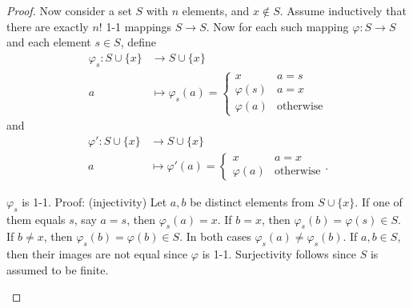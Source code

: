 \begin{enumerate}[resume]
\begin{proof}
	Now consider a set $S$ with $n$ elements, and $x \not\in S$. Assume inductively that there are exactly $n!$ 1-1 mappings $S \to  S$. Now for each such mapping $\varphi : S \to  S$ and each element $s \in S$, define
\begin{align*}
	\varphi_s: S \cup \{x\}  &\longrightarrow S \cup \{x\}  \\
	a &\longmapsto \varphi_s(a) = \begin{cases}
		x & a = s \\
		\varphi(s) & a = x \\
		\varphi(a) & \text{otherwise}
	\end{cases}
\end{align*}
and 
\begin{align*}
	\varphi': S \cup \{x\}  &\longrightarrow S \cup \{x\}  \\
	a &\longmapsto \varphi'(a) = \begin{cases}
		x & a = x \\
		\varphi(a) & \text{otherwise}
	\end{cases}
.\end{align*}
\begin{claim}
	$\varphi_s$ is 1-1. Proof: (injectivity) Let $a,b$ be distinct elements from $S \cup \{x\} $. If one of them equals  $s$, say $a = s$, then $\varphi_s(a) = x$. If $b = x$, then $\varphi_s(b) = \varphi(s) \in S$. If $b \neq  x$, then $\varphi_s(b) = \varphi(b) \in S$. In both cases $\varphi_s(a) \neq  \varphi_s(b)$. If $a,b \in S$, then their images are not equal  since  $\varphi$ is 1-1. 
	Surjectivity follows since  $S$ is assumed to be finite.
\end{claim}


\end{proof}
\end{enumerate}
